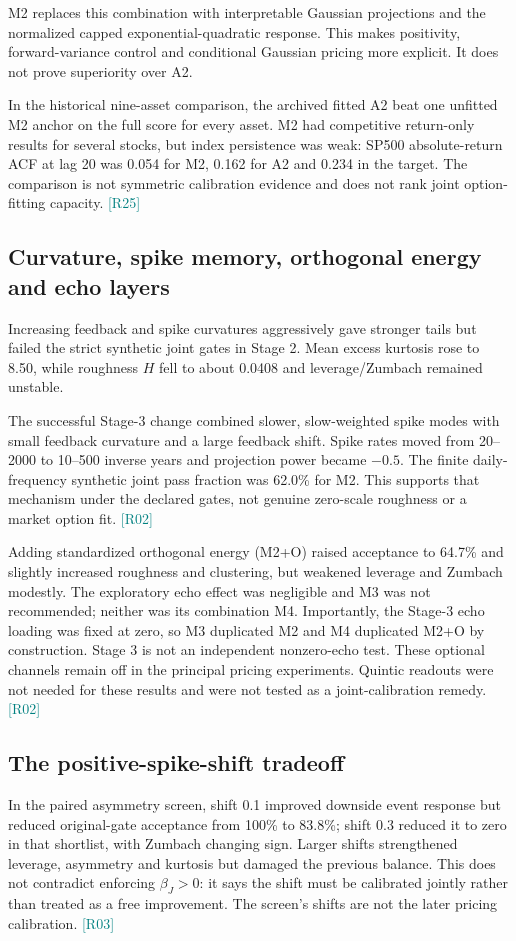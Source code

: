 \documentclass[11pt,a4paper]{article}
\newcommand{\src}[1]{\textcolor{teal}{\small[#1]}}
\begin{document}
M2 replaces this combination with interpretable Gaussian projections and the normalized capped exponential-quadratic response. This makes positivity, forward-variance control and conditional Gaussian pricing more explicit. It does not prove superiority over A2.

In the historical nine-asset comparison, the archived fitted A2 beat one unfitted M2 anchor on the full score for every asset. M2 had competitive return-only results for several stocks, but index persistence was weak: SP500 absolute-return ACF at lag 20 was 0.054 for M2, 0.162 for A2 and 0.234 in the target. The comparison is not symmetric calibration evidence and does not rank joint option-fitting capacity. \src{R25}

\subsection{Curvature, spike memory, orthogonal energy and echo layers}
Increasing feedback and spike curvatures aggressively gave stronger tails but failed the strict synthetic joint gates in Stage 2. Mean excess kurtosis rose to 8.50, while roughness $H$ fell to about 0.0408 and leverage/Zumbach remained unstable.

The successful Stage-3 change combined slower, slow-weighted spike modes with small feedback curvature and a large feedback shift. Spike rates moved from 20--2000 to 10--500 inverse years and projection power became $-0.5$. The finite daily-frequency synthetic joint pass fraction was 62.0\% for M2. This supports that mechanism under the declared gates, not genuine zero-scale roughness or a market option fit. \src{R02}

Adding standardized orthogonal energy (M2+O) raised acceptance to 64.7\% and slightly increased roughness and clustering, but weakened leverage and Zumbach modestly. The exploratory echo effect was negligible and M3 was not recommended; neither was its combination M4. Importantly, the Stage-3 echo loading was fixed at zero, so M3 duplicated M2 and M4 duplicated M2+O by construction. Stage 3 is not an independent nonzero-echo test. These optional channels remain off in the principal pricing experiments. Quintic readouts were not needed for these results and were not tested as a joint-calibration remedy. \src{R02}

\subsection{The positive-spike-shift tradeoff}
In the paired asymmetry screen, shift 0.1 improved downside event response but reduced original-gate acceptance from 100\% to 83.8\%; shift 0.3 reduced it to zero in that shortlist, with Zumbach changing sign. Larger shifts strengthened leverage, asymmetry and kurtosis but damaged the previous balance. This does not contradict enforcing $\beta_J>0$: it says the shift must be calibrated jointly rather than treated as a free improvement. The screen's shifts are not the later pricing calibration. \src{R03}
\end{document}

